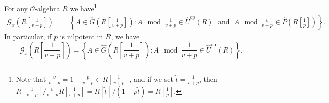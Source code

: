 \documentclass[10pt,a4paper]{amsart}
\begin{document}
\begin{lemma}
    \label{res:explicit-negative-loop-group}
    For any \(\mathcal{O}\)-algebra \(R\) we have\footnote{Note that \(\frac{v}{v+p} = 1 - \frac{p}{v+p} \in R \left[ \frac{1}{v+p} \right]\), and if we set \(\tilde{t} = \frac{1}{v+p}\), then \(R\left[\frac{1}{v+p}\right] / \frac{v}{v+p}R \left[\frac{1}{v+p}\right] = R [\tilde{t}] / (1 - p\tilde{t}) = R\left[\frac{1}{p}\right]\).}
    \begin{align*} 
        \mathcal{G}_{x} \left( R \left[ \frac{1}{v+p} \right] \right) 
        & = \left\lbrace A \in \widehat{G}\left( R \left[ \frac{1}{v+p} \right] \right) : A \mod \frac{1}{v+p} \in \widehat{U}^\text{op}(R) \,\,\text{ and }\,\, A \mod \frac{v}{v+p} \in \widehat{P}\left( R \left[ \frac{1}{p} \right] \right) \right\rbrace .
    \end{align*}
    In particular, if \(p\) is nilpotent in \(R\), we have
    \[
        \mathcal{G}_{x} \left( R \left[ \frac{1}{v+p} \right] \right)
        = \left\lbrace A \in \widehat{G}\left(R \left[\frac{1}{v+p}\right]\right) : A \mod \frac{1}{v+p} \in \widehat{U}^\text{op}(R) \right\rbrace . 
    \]
\end{lemma}
\end{document}
